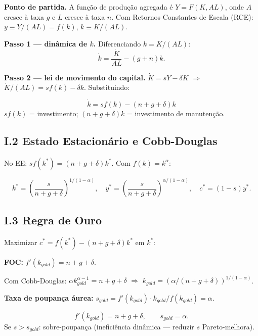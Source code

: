 \documentclass[12pt, a4paper]{article}
\begin{document}
\textbf{Ponto de partida.} A função de produção agregada é $Y = F(K, AL)$, onde $A$ cresce à taxa $g$ e $L$ cresce à taxa $n$. Com Retornos Constantes de Escala (RCE): $y \equiv Y/(AL) = f(k)$, $k \equiv K/(AL)$.

\textbf{Passo 1 --- dinâmica de $k$.} Diferenciando $k = K/(AL)$:
\[
\dot{k} = \frac{\dot{K}}{AL} - (g+n)k.
\]

\textbf{Passo 2 --- lei de movimento do capital.} $\dot{K} = sY - \delta K$ $\Rightarrow$ $\dot{K}/(AL) = sf(k) - \delta k$. Substituindo:

\begin{formulabox}[title={Equação Fundamental de Solow}]
\[
\boxed{\dot{k} = sf(k) - (n+g+\delta)k}
\]
$sf(k)$ = investimento; $(n+g+\delta)k$ = investimento de manutenção.
\end{formulabox}

\subsection*{I.2 Estado Estacionário e Cobb-Douglas}

No EE: $sf(k^*) = (n+g+\delta)k^*$. Com $f(k) = k^\alpha$:

\begin{resultbox}[title={Estado Estacionário de Solow --- Cobb-Douglas}]
\[
k^* = \left(\frac{s}{n+g+\delta}\right)^{\!1/(1-\alpha)}, \quad
y^* = \left(\frac{s}{n+g+\delta}\right)^{\!\alpha/(1-\alpha)}, \quad
c^* = (1-s)y^*.
\]
\end{resultbox}

\subsection*{I.3 Regra de Ouro}

Maximizar $c^* = f(k^*) - (n+g+\delta)k^*$ em $k^*$:

\textbf{FOC:} $f'(k_{gold}) = n+g+\delta$.

Com Cobb-Douglas: $\alpha k_{gold}^{\alpha-1} = n+g+\delta$ $\Rightarrow$ $k_{gold} = (\alpha/(n+g+\delta))^{1/(1-\alpha)}$.

\textbf{Taxa de poupança áurea:} $s_{gold} = f'(k_{gold})\cdot k_{gold}/f(k_{gold}) = \alpha$.

\begin{resultbox}[title={Regra de Ouro de Solow}]
\[
f'(k_{gold}) = n+g+\delta, \qquad s_{gold} = \alpha.
\]
Se $s > s_{gold}$: sobre-poupança (ineficiência dinâmica --- reduzir $s$ Pareto-melhora).
\end{resultbox}
\end{document}
